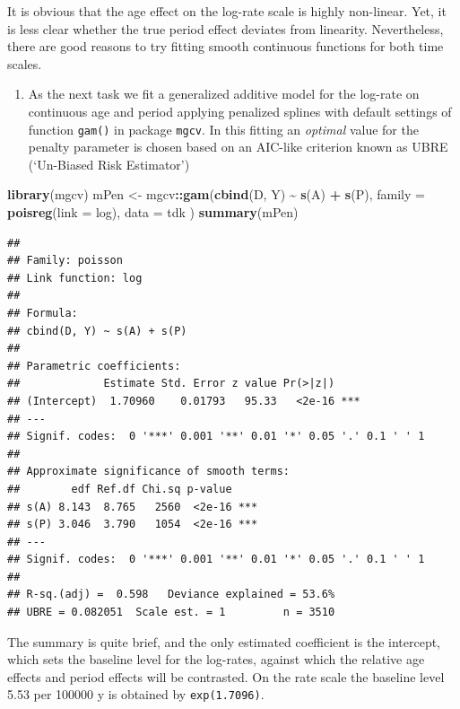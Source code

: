 \documentclass[
]{book}
\newenvironment{Shaded}{\begin{snugshade}}{\end{snugshade}}
\newcommand{\AttributeTok}[1]{\textcolor[rgb]{0.13,0.29,0.53}{#1}}
\newcommand{\FunctionTok}[1]{\textcolor[rgb]{0.13,0.29,0.53}{\textbf{#1}}}
\newcommand{\NormalTok}[1]{#1}
\newcommand{\OtherTok}[1]{\textcolor[rgb]{0.56,0.35,0.01}{#1}}
\newcommand{\SpecialCharTok}[1]{\textcolor[rgb]{0.81,0.36,0.00}{\textbf{#1}}}
\providecommand{\tightlist}{%
  \setlength{\itemsep}{0pt}\setlength{\parskip}{0pt}}
\begin{document}
It is obvious that the age effect on the log-rate scale is highly
non-linear. Yet, it is less clear whether the true period effect
deviates from linearity. Nevertheless, there are good reasons to
try fitting smooth continuous functions for both time scales.

\begin{enumerate}
\def\labelenumi{\arabic{enumi}.}
\tightlist
\item
  As the next task we fit a generalized additive model for the
  log-rate on continuous age and period applying penalized splines
  with default settings of function \texttt{gam()} in package
  \texttt{mgcv}. In this fitting an \emph{optimal} value for the penalty
  parameter is chosen based on an AIC-like criterion known as UBRE
  (`Un-Biased Risk Estimator')
\end{enumerate}

\begin{Shaded}
\begin{Highlighting}[]
\FunctionTok{library}\NormalTok{(mgcv)}
\NormalTok{mPen }\OtherTok{\textless{}{-}}\NormalTok{ mgcv}\SpecialCharTok{::}\FunctionTok{gam}\NormalTok{(}\FunctionTok{cbind}\NormalTok{(D, Y) }\SpecialCharTok{\textasciitilde{}} \FunctionTok{s}\NormalTok{(A) }\SpecialCharTok{+} \FunctionTok{s}\NormalTok{(P),}
  \AttributeTok{family =} \FunctionTok{poisreg}\NormalTok{(}\AttributeTok{link =}\NormalTok{ log), }\AttributeTok{data =}\NormalTok{ tdk}
\NormalTok{)}
\FunctionTok{summary}\NormalTok{(mPen)}
\end{Highlighting}
\end{Shaded}

\begin{verbatim}
## 
## Family: poisson 
## Link function: log 
## 
## Formula:
## cbind(D, Y) ~ s(A) + s(P)
## 
## Parametric coefficients:
##             Estimate Std. Error z value Pr(>|z|)    
## (Intercept)  1.70960    0.01793   95.33   <2e-16 ***
## ---
## Signif. codes:  0 '***' 0.001 '**' 0.01 '*' 0.05 '.' 0.1 ' ' 1
## 
## Approximate significance of smooth terms:
##        edf Ref.df Chi.sq p-value    
## s(A) 8.143  8.765   2560  <2e-16 ***
## s(P) 3.046  3.790   1054  <2e-16 ***
## ---
## Signif. codes:  0 '***' 0.001 '**' 0.01 '*' 0.05 '.' 0.1 ' ' 1
## 
## R-sq.(adj) =  0.598   Deviance explained = 53.6%
## UBRE = 0.082051  Scale est. = 1         n = 3510
\end{verbatim}

The summary is quite brief, and the only estimated coefficient is the
intercept, which sets the baseline level for the log-rates, against
which the relative age effects and period effects will be contrasted.
On the rate scale the baseline level 5.53 per 100000 y is obtained by
\texttt{exp(1.7096)}.
\end{document}
